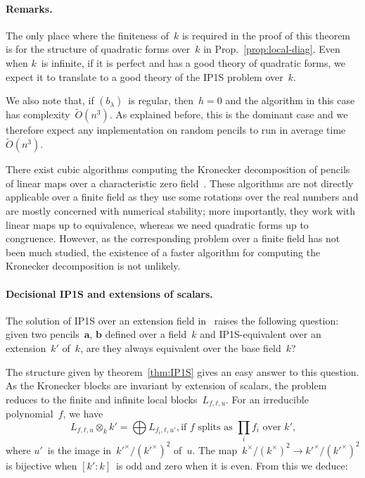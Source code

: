 \documentclass{article}%
\def\Ot{\widetilde{O}}
\begin{document}
\paragraph{Remarks.}

The only place where the finiteness of~$k$ is required in the proof of
this theorem is for the structure of quadratic forms over~$k$ in
Prop.~\ref{prop:local-diag}. Even when $k$~is infinite, if it is perfect
and has a good theory of quadratic forms,
we expect it to translate to a good theory of the IP1S problem over~$k$.

We also note that, if $(b_{λ})$~is regular,
then~$h = 0$ and the algorithm in this case has complexity~$\Ot(n^3)$. As
explained before, this is the dominant case and we therefore expect any
implementation on random pencils to run in average time~$\Ot(n^3)$.

There exist cubic algorithms computing the Kronecker decomposition of pencils of
linear maps over a characteristic zero field~\cite{beelen1988improved}.
These algorithms are not directly applicable over a finite field as they
use some rotations over the real numbers and are mostly concerned with
numerical stability; more importantly, they work with linear maps up to
equivalence, whereas we need quadratic forms up to congruence. However, as the
corresponding problem over a finite field has not been much studied, the
existence of a faster algorithm for computing the Kronecker decomposition is not
unlikely.

\paragraph{Decisional IP1S and extensions of scalars.}

The solution of IP1S over an extension field
in~\cite{DBLP:journals/corr/BerthomieuFP13} raises the following
question: given two pencils~$\bm{a}$, $\bm{b}$ defined over a field~$k$
and IP1S-equivalent over an extension~$k'$ of~$k$, are they always
equivalent over the base field~$k$?

The structure given by theorem~\ref{thm:IP1S} gives an easy answer
to this question. As the Kronecker blocks are invariant by extension of
scalars, the problem reduces to the finite and infinite local
blocks~$L_{f,ℓ,u}$. For an irreducible polynomial~$f$, we have
\begin{equation}\label{local-extension}
L_{f,ℓ,u} ⊗_{k} k' = %
⨁ L_{f_i, ℓ,u'}, %
\text{if $f$~splits as~$∏_i f_i$ over~$k'$,}
\end{equation}
where $u'$~is the image in~$k'^{×}/(k'^{×})^2$ of~$u$. The
map~$k^{×}/(k^{×})^2 → k'^{×}/(k'^{×})^2$ is bijective when $[k':k]$~is
odd and zero when it is even. From this we deduce:
\end{document}
